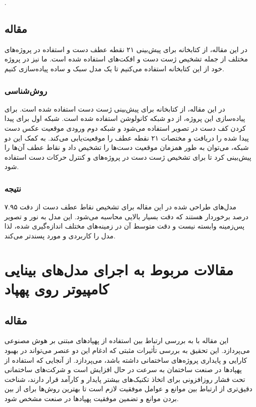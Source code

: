 \cite{chen2021visual}.


\subsection{مقاله }
در این مقاله، از کتابخانه  برای پیش‌بینی ۲۱ نقطه عطف دست و استفاده در پروژه‌های مختلف از جمله تشخیص ژست دست و افکت‌های  استفاده شده است. ما نیز در پروژه خود از این کتابخانه استفاده می‌کنیم تا یک مدل سبک و ساده پیاده‌سازی کنیم.

\subsubsection{روش‌شناسی}
در این مقاله، از کتابخانه  برای پیش‌بینی ژست دست استفاده شده است. برای پیاده‌سازی این پروژه، از دو شبکه کانولوشن استفاده شده است. شبکه اول برای پیدا کردن کف دست در تصویر استفاده می‌شود و شبکه دوم ورودی 
موقعیت عکس دست پیدا شده را دریافت و مختصات ۲۱ نقطه عطف را موقعیت‌یابی می‌کند. به کمک این دو شبکه، می‌توان به طور همزمان موقعیت دست‌ها را تشخیص داد و 
نقاط عطف آن‌ها را پیش‌بینی کرد تا برای تشخیص ژست دست در پروژه‌های  و کنترل حرکات دست استفاده شود.

\subsubsection{نتیجه}
مدل‌های طراحی شده در این مقاله برای تشخیص نقاط عطف دست از دقت ۷.۹۵ درصد برخوردار هستند که دقت بسیار بالایی محاسبه می‌شود. این مدل به نور و تصویر پس‌زمینه 
وابسته نیست و دقت متوسط آن در زمینه‌های مختلف اندازه‌گیری شده، لذا مدل را کاربردی و مورد پسندتر می‌کند.

\cite{zhang2020mediapipe} 







\section{مقالات مربوط به اجرای مدل‌های بینایی کامپیوتر روی پهپاد}
\subsection{مقاله }
این مقاله با به بررسی ارتباط بین استفاده از پهپادهای مبتنی بر هوش مصنوعی می‌پردازد. این تحقیق به بررسی تأثیرات مثبتی که ادغام این دو عنصر می‌تواند در بهبود کارایی و پایداری پروژه‌های
ساختمانی داشته باشد، می‌پردازد. از آنجایی که استفاده از پهپادها در صنعت ساختمان به سرعت در حال افزایش است و شرکت‌های ساختمانی تحت فشار روزافزونی برای اتخاذ 
تکنیک‌های بیشتر پایدار و کارآمد قرار دارند، شناخت دقیق‌تری از ارتباط بین موانع و عوامل موفقیت لازم است تا بهترین روش‌ها برای از بین بردن موانع و تضمین موفقیت پهپادها در صنعت مشخص شود.

